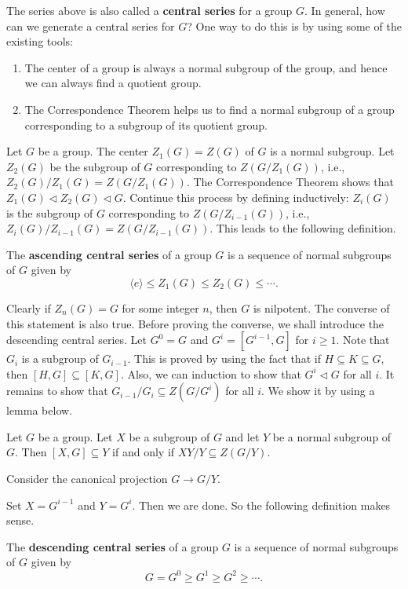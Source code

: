The series above is also called a \textbf{central series} for a group $G$.
In general, how can we generate a central series for $ G $? One way to do this is by using some of the existing tools: 
\begin{enumerate}[(1)]
	\item The center of a group is always a normal subgroup of the group, and hence we can always find a quotient group.
	\item The Correspondence Theorem helps us to find a normal subgroup of a group corresponding to a subgroup of its quotient group.
\end{enumerate}

Let $ G $ be a group. The center $Z_1(G) =  Z(G) $ of $ G $ is a normal subgroup. Let $ Z_{2}(G) $ be the subgroup of $G$ corresponding to $ Z(G/Z_1(G)) $, i.e., $
	Z_2(G) / Z_1(G) = Z(G/Z_1(G))$. The Correspondence Theorem shows that $Z_1(G) \lhd Z_2(G) \lhd G$.  Continue this process by defining inductively:  $Z_{i}(G)$ is the subgroup of $G$ corresponding to $ Z(G/Z_{i-1}(G)) $, i.e., $Z_i(G) / Z_{i-1}(G) = Z(G/Z_{i-1}(G))$. This leads to the following definition.

\begin{definition}
 	The \textbf{ascending central series} of a group $G$ is a sequence of normal subgroups of $G$ given by  $$ \langle e \rangle \leq Z_{1}(G) \leq  Z_{2}(G) \leq  \cdots .$$
\end{definition} 
 Clearly if $Z_n (G) = G$ for some integer $n$, then $G$ is nilpotent. The converse of this statement is also true. Before proving the converse, we shall introduce the descending central series. Let $G^0 = G$ and $G^i = [G^{i-1},G]$ for $i\geq 1$. Note that $G_i$ is a subgroup of $G_{i-1}$. This is proved by using the fact that if $H\subseteq K \subseteq G$, then $[H,G]\subseteq [K,G]$. Also, we can induction to show that $G^i\lhd G$  for all $i$. It remains to show that $G_{i-1}/G_i\subseteq Z(G/G^i)$  for all $i$. We show it by using a lemma below.
 \begin{lemma} \label{lemma-for-nilpotent}
 	Let $G$ be a group. Let $X$ be a subgroup of $G$ and let $Y$ be a normal subgroup of $G$. Then $[X,G]\subseteq Y$ if and only if $XY/Y\subseteq Z(G/Y)$.
 \end{lemma}
 \begin{sketch}
 	Consider the canonical projection $G\rightarrow G/Y$.
 \end{sketch}
 Set $X = G^{i-1}$ and $Y = G^i$. Then we are done. So the following definition makes sense.
 \begin{definition}
 	The \textbf{descending central series} of a group $G$ is a sequence of normal subgroups of $G$ given by  $$ G = G^0  \geq G^1 \geq  G^2 \geq  \cdots .$$
 \end{definition}
 
